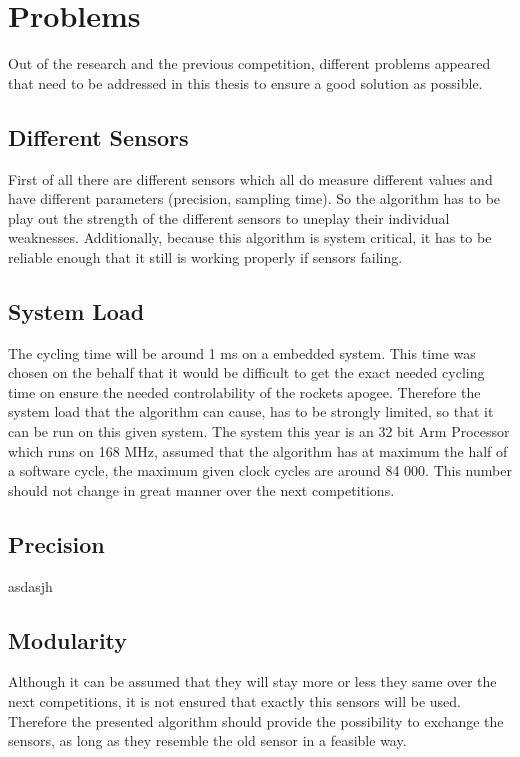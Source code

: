  
 \section{Problems}
 
 Out of the research and the previous competition, different problems appeared that need to be addressed in this thesis to ensure a good solution as possible.
 
 \subsection{Different Sensors}
 First of all there are different sensors which all do measure different values and have different parameters (precision, sampling time).
 So the algorithm has to be play out the strength of the different sensors to uneplay their individual weaknesses.
 Additionally, because this algorithm is system critical, it has to be reliable enough that it still is working properly if sensors failing. 
 \subsection{System Load}
 The cycling time will be around 1 ms on a embedded system. This time was chosen on the behalf that it would be difficult to get the exact needed cycling time on ensure the needed controlability of the rockets apogee.
 Therefore the system load that the algorithm can cause, has to be strongly limited, so that it can be run on this given system. 
 The system this year is an 32 bit Arm Processor which runs on 168 MHz, assumed that the algorithm has at maximum the half of a software cycle, the maximum given clock cycles are around 84 000.
 This number should not change in great manner over the next competitions.
 \subsection{Precision}
 asdasjh
 \subsection{Modularity}
 Although it can be assumed that they will stay more or less they same over the next competitions, it is not ensured that exactly this sensors will be used.
 Therefore the presented algorithm should provide the possibility to exchange the sensors, as long as they resemble the old sensor in a feasible way.
 
